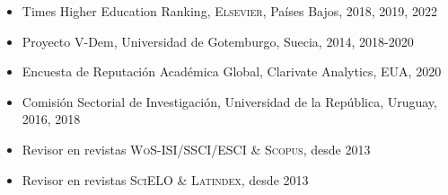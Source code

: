 





\begin{publications}

\begin{itemize}
\item{\small Times Higher Education Ranking, {\scshape Elsevier}, Países Bajos, 2018, 2019, 2022}
\item{\small Proyecto V-Dem, Universidad de Gotemburgo, Suecia, 2014, 2018-2020}
\item{\small Encuesta de Reputación Académica Global, Clarivate Analytics, EUA, 2020}
\item{\small Comisión Sectorial de Investigación, Universidad de la Rep\'ublica, Uruguay, 2016, 2018}
\item{\small Revisor en revistas {\scshape WoS-ISI/SSCI/ESCI} \& {\scshape Scopus}, desde 2013}
\item{\small Revisor en revistas {\scshape SciELO} \& {\scshape Latindex}, desde 2013}
\end{itemize}

\vspace{1mm}
\end{publications}

